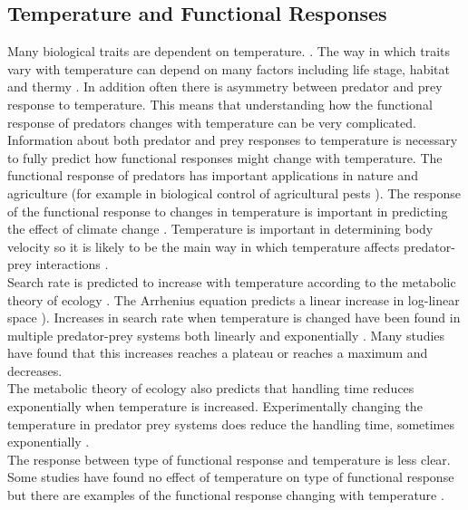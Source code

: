 \documentclass{article}
\begin{document}
\subsection{Temperature and Functional Responses}
Many biological traits are dependent on temperature. \cite{Dell2014TemperatureStrategy,Dell2011SystematicTraits}. The way in which traits vary with temperature can depend on many factors including life stage\cite{Cator2019MoreResearch}, habitat \cite{Dell2011SystematicTraits} and thermy \cite{Dell2014TemperatureStrategy}. In addition often there is asymmetry between predator and prey response to temperature\cite{Dell2014TemperatureStrategy}. This means that understanding how the functional response of predators changes with temperature can be very complicated. Information about both predator and prey responses to temperature is necessary to fully predict how functional responses might change with temperature. The functional response of predators has important applications in nature and agriculture (for example in biological control of agricultural pests \cite{Gilioli2005TemperatureIndividuals} ). The response of the functional response to changes in temperature is important in predicting the effect of climate change \cite{Ohlund2014TemperaturePrey}.  Temperature is important in determining body velocity so it is likely to be the main way in which temperature affects predator-prey interactions \cite{Dell2014TemperatureStrategy}.\\
Search rate is predicted to increase with temperature according to the metabolic theory of ecology \cite{Brown2004TowardEcology}. The Arrhenius equation predicts a linear increase in log-linear space \cite{Englund2011TemperatureResponse}). Increases in search rate when temperature is changed have been found in multiple predator-prey systems both linearly \cite{Gilioli2005TemperatureIndividuals,Zamani2006Temperature-dependentAphid} and exponentially \cite{Lefebure2014TemperatureResource-limited}. Many studies have found that this increases reaches a plateau \cite{McCoull1998EffectNaucoridae,Thompson1978TowardsElegans} or  reaches a maximum and decreases\cite{Englund2011TemperatureResponse,Zamani2006Temperature-dependentAphid,Sentis2012UsingEfficiency}.
\\
The metabolic theory of ecology \cite{Brown2004TowardEcology} also predicts that handling time reduces exponentially when temperature is increased. Experimentally changing the temperature in predator prey systems does reduce the handling time\cite{Thompson1978TowardsElegans,McCoull1998EffectNaucoridae,Jalali2010EffectPersicae,Zamani2006Temperature-dependentAphid}, sometimes exponentially \cite{Sentis2012UsingEfficiency,}. \\
The response between type of functional response and temperature is less clear. Some studies have found no effect of temperature on type of functional response  \cite{Sentis2012UsingEfficiency} but there are examples of the functional response changing with temperature \cite{Taylor2003EffectAmericanus}.
\end{document}

